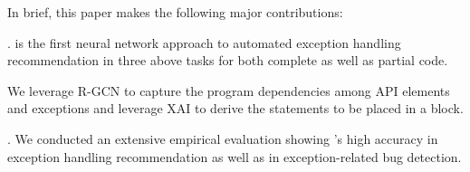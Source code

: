 
In brief, this paper makes the following major contributions:

. {\tool} is the first neural network approach to
  automated exception handling recommendation in three above tasks for both complete as
  well as partial code.

   We
  leverage R-GCN to capture the program
  dependencies among API elements and exceptions and leverage XAI
  to derive the statements to be placed in a  block.

. We conducted an extensive
empirical evaluation showing {\tool}'s high accuracy in exception
handling recommendation as well as in exception-related bug detection.


  
